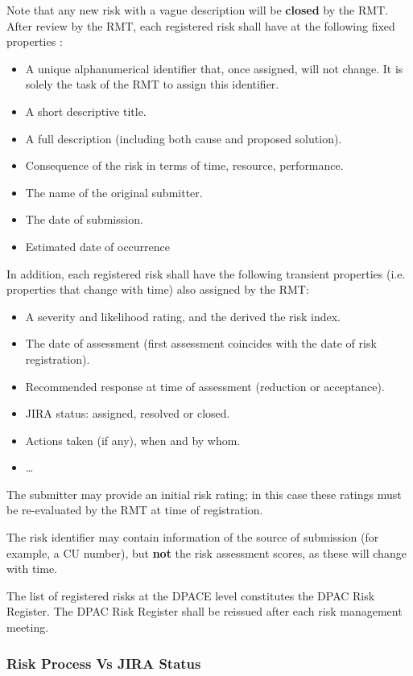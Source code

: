 Note that any new risk with a vague description will be \textbf{closed} by the RMT.
After review by the RMT, each registered risk shall have at the following fixed properties :

\begin{itemize}
\item A unique alphanumerical identifier that, once assigned, will not change.  It is solely the task of the RMT to assign this identifier.
\item A short descriptive title.
\item A full description (including both cause and proposed solution).
\item Consequence of the risk in terms of time, resource, performance.
\item The name of the original submitter.
\item The date of submission.
\item Estimated date of occurrence
\end{itemize}

In addition, each registered risk shall have the following transient properties (i.e. properties that change with time) also assigned by the RMT:
\begin{itemize}
\item A severity and likelihood rating, and the derived the risk index.
\item The date of assessment (first assessment coincides with the date of risk registration).
\item Recommended response at time of assessment (reduction or acceptance).
\item JIRA status: assigned, resolved or closed.
\item Actions taken (if any), when and by whom.
\item \ldots
\end{itemize}

The submitter may provide an initial risk rating; in this case these ratings must be re-evaluated by the RMT at time of registration.

The risk identifier may contain information of the source of submission (for example, a CU number), but {\bf not} the risk assessment scores, as these will change with time.

The list of registered risks at the DPACE level constitutes the DPAC Risk Register. The DPAC Risk Register shall be reissued after each risk management meeting.

\subsubsection{Risk Process Vs JIRA Status \label{sect:JIRA}}



